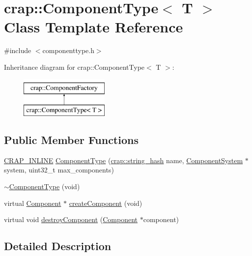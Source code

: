 \hypertarget{classcrap_1_1_component_type}{}\section{crap\+:\+:Component\+Type$<$ T $>$ Class Template Reference}
\label{classcrap_1_1_component_type}


{\ttfamily \#include $<$componenttype.\+h$>$}

Inheritance diagram for crap\+:\+:Component\+Type$<$ T $>$\+:\begin{figure}[H]
\begin{center}
\leavevmode
\includegraphics[height=2.000000cm]{classcrap_1_1_component_type}
\end{center}
\end{figure}
\subsection*{Public Member Functions}
\begin{DoxyCompactItemize}
\item 
\hyperlink{config__x86_8h_a5a40526b8d842e7ff731509998bb0f1c}{C\+R\+A\+P\+\_\+\+I\+N\+L\+I\+N\+E} \hyperlink{classcrap_1_1_component_type_a752df8ceb8fe9e0546719999dcf8f954}{Component\+Type} (\hyperlink{classcrap_1_1string__hash}{crap\+::string\+\_\+hash} name, \hyperlink{classcrap_1_1_component_system}{Component\+System} $\ast$system, uint32\+\_\+t max\+\_\+components)
\item 
\hyperlink{classcrap_1_1_component_type_ac8906e80d700e2e8c056f5e4fb0048c7}{$\sim$\+Component\+Type} (void)
\item 
virtual \hyperlink{classcrap_1_1_component}{Component} $\ast$ \hyperlink{classcrap_1_1_component_type_ae6eec7a4d025c5083645f84e36dc5bba}{create\+Component} (void)
\item 
virtual void \hyperlink{classcrap_1_1_component_type_af9a5da189315613847499c107c1a3916}{destroy\+Component} (\hyperlink{classcrap_1_1_component}{Component} $\ast$component)
\end{DoxyCompactItemize}


\subsection{Detailed Description}

